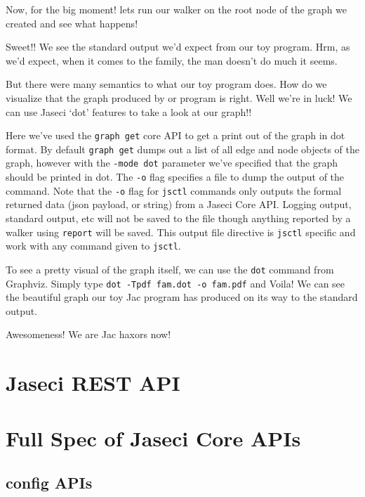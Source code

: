\par
Now, for the big moment! lets run our walker on the root node of the graph we created and see what happens!
\par
{}
\par
Sweet!! We see the standard output we'd expect from our toy program. Hrm, as we'd expect, when it comes to the family, the man doesn't do much it seems.
\par
But there were many semantics to what our toy program does. How do we visualize that the graph produced by or program is right. Well we're in luck! We can use Jaseci `dot' features to take a look at our graph!!
\par
{}
\par
{}
Here we've used the \texttt{graph get} core API to get a print out of the graph in dot format. By default \texttt{graph get} dumps out a list of all edge and node objects of the graph, however with the \texttt{-mode dot} parameter we've specified that the graph should be printed in dot. The \texttt{-o} flag specifies a file to dump the output of the command. Note that the \texttt{-o} flag for \texttt{jsctl} commands only outputs the formal returned data (json payload, or string) from a Jaseci Core API. Logging output, standard output, etc will not be saved to the file though anything reported by a walker using \texttt{report} will be saved. This output file directive is \texttt{jsctl} specific and work with any command given to \texttt{jsctl}.
\par
To see a pretty visual of the graph itself, we can use the \texttt{dot} command from Graphviz. Simply type \texttt{dot -Tpdf fam.dot -o fam.pdf} and Voila! We can see the beautiful graph our toy Jac program has produced on its way to the standard output.
\par
Awesomeness! We are Jac \Gls{haxor}s now!

\section{Jaseci REST API}

\section{Full Spec of Jaseci Core APIs}
\subsection{config APIs}
